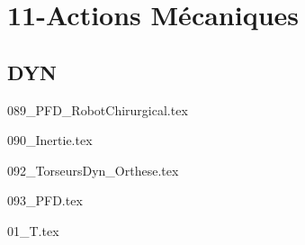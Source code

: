 \clearpage
\chapter{11-Actions Mécaniques}

\section{DYN}

\setcounter{question}{0}
{}
\graphicspath{{../11-Actions Mécaniques/TD/DYN/089_PFD_RobotChirurgical/images/}{../11-Actions Mécaniques/TD/DYN/089_PFD_RobotChirurgical/}{../Style/png/}}
{089_PFD_RobotChirurgical.tex}

\setcounter{question}{0}
{}
\graphicspath{{../11-Actions Mécaniques/TD/DYN/090_Inertie/images/}{../11-Actions Mécaniques/TD/DYN/090_Inertie/}{../Style/png/}}
{090_Inertie.tex}

\setcounter{question}{0}
{}
\graphicspath{{../11-Actions Mécaniques/TD/DYN/092_TorseursDyn_Orthese/images/}{../11-Actions Mécaniques/TD/DYN/092_TorseursDyn_Orthese/}{../Style/png/}}
{092_TorseursDyn_Orthese.tex}

\setcounter{question}{0}
{}
\graphicspath{{../11-Actions Mécaniques/TD/DYN/093_PFD/images/}{../11-Actions Mécaniques/TD/DYN/093_PFD/}{../Style/png/}}
{093_PFD.tex}

\setcounter{question}{0}
{}
\graphicspath{{../11-Actions Mécaniques/TD/DYN/DYN-01/01_T/images/}{../11-Actions Mécaniques/TD/DYN/DYN-01/01_T/}{../Style/png/}}
{01_T.tex}

